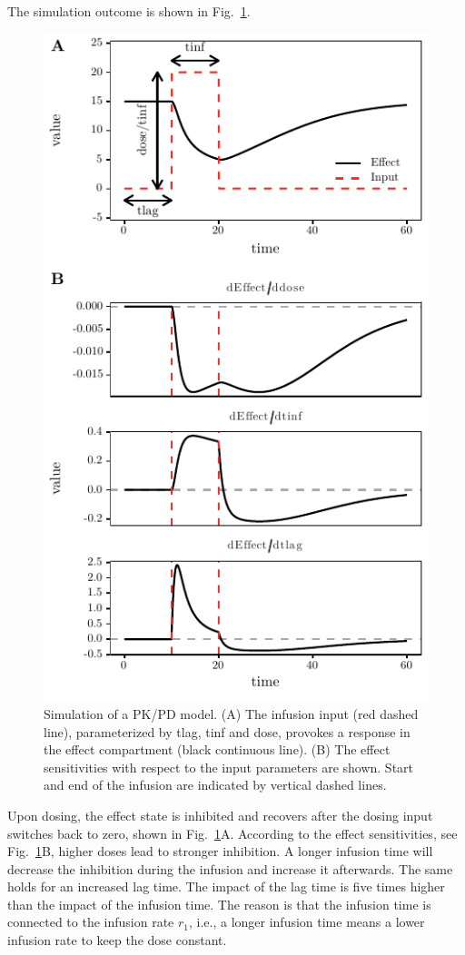 \documentclass[journal, a4paper]{IEEEtran}
\begin{document}
The simulation outcome is shown in Fig.~\ref{fig:simulation}. 
\begin{figure}[ht]
    \centering
    \includegraphics{Code/example.pdf}
    \caption{Simulation of a PK/PD model. (A) The infusion input (red dashed line), parameterized by tlag, tinf and dose, provokes a response in the effect compartment (black continuous line). (B) The effect sensitivities with respect to the input parameters are shown. Start and end of the infusion are indicated by vertical dashed lines.}
    \label{fig:simulation}
\end{figure}
Upon dosing, the effect state is inhibited and recovers after the dosing input switches back to zero, shown in Fig.~\ref{fig:simulation}A. According to the effect sensitivities, see Fig.~\ref{fig:simulation}B, higher doses lead to stronger inhibition. A longer infusion time will decrease the inhibition during the infusion and increase it afterwards. The same holds for an increased lag time. The impact of the lag time is five times higher than the impact of the infusion time. The reason is that the infusion time is connected to the infusion rate $r_1$, i.e., a longer infusion time means a lower infusion rate to keep the dose constant.
\end{document}
